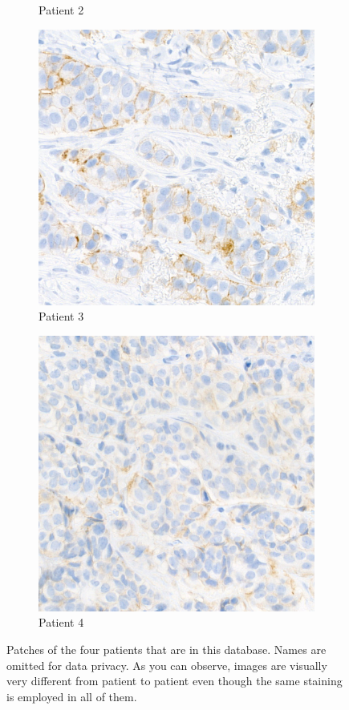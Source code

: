 \begin{figure}[H]
\begin{subfigure}[b]{0.24\textwidth}
    \caption{Patient 2}
  \end{subfigure}
  \hfill
  \begin{subfigure}[b]{0.24\textwidth}
    \includegraphics[width=\textwidth]{imgs/data/p3.png}
    \caption{Patient 3}
  \end{subfigure}
  \hfill
  \begin{subfigure}[b]{0.24\textwidth}
    \includegraphics[width=\textwidth]{imgs/data/p4.png}
    \caption{Patient 4}
  \end{subfigure}
    \caption{Patches of the four patients that are in this database. Names are omitted for data privacy. As you can observe, images are visually very different from patient to patient even though the same staining is employed in all of them.}
    \label{fig:mama_ex}
\end{figure}

